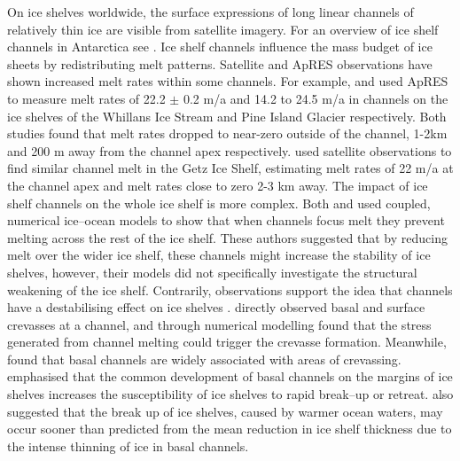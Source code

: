 On ice shelves worldwide, the surface expressions of long linear channels of relatively thin ice are visible from satellite imagery. For an overview of ice shelf channels in Antarctica see \cite{alley2016impacts}.
Ice shelf channels influence the mass budget of ice sheets by redistributing melt patterns. Satellite and ApRES observations have shown increased melt rates within some channels. For example, \cite {marsh2016high} and \cite{stanton2013channelized}  used ApRES to measure melt rates of 22.2 $\pm$ 0.2 m/a and 14.2 to 24.5 m/a in channels on the ice shelves of the Whillans Ice Stream and Pine Island Glacier respectively. Both studies found that melt rates dropped to near-zero outside of the channel, 1-2km and 200 m away from the channel apex respectively. \cite{chartrand2020basal} used satellite observations to find similar channel melt in the  Getz Ice Shelf, estimating melt rates of 22 m/a at the channel apex and melt rates close to zero 2-3 km away.
The impact of ice shelf channels on the whole ice shelf is more complex. Both \cite{gladish2012ice} and \cite{millgate2013effect} used coupled, numerical ice--ocean models to show that when channels focus melt they prevent melting across the rest of the ice shelf.  These authors suggested that by reducing melt over the wider ice shelf, these channels might increase the stability of ice shelves, however, their models did not specifically investigate the structural weakening of the ice shelf. Contrarily, observations support the idea that channels have a destabilising effect on ice shelves \cite [e.g.][] {alley2016impacts}. \cite{vaughan2012subglacial} directly observed basal and surface crevasses at a channel, and through numerical modelling found that the stress generated from channel melting could trigger the crevasse formation.
Meanwhile, \cite{alley2016impacts} found that basal channels are widely associated with areas of crevassing. \cite{alley2019troughs} emphasised that the common development of basal channels on the margins of ice shelves increases the susceptibility of ice shelves to rapid break--up or retreat.
\cite{rignot2008recent} also suggested that the  break up of ice shelves, caused by warmer ocean waters, may occur sooner than predicted from the mean reduction in ice shelf thickness due to the intense thinning of ice in basal channels.

